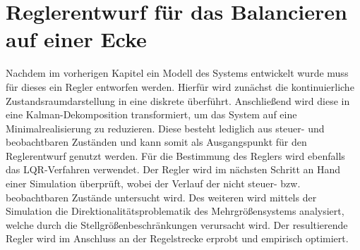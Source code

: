 \ifx\FORMAT\undefined


\fi

\chapter{Reglerentwurf für das Balancieren auf einer Ecke}\label{chapter_RT_Corner}
Nachdem im vorherigen Kapitel ein Modell des Systems entwickelt wurde muss für dieses ein Regler entworfen werden. Hierfür wird zunächst die kontinuierliche Zustandsraumdarstellung in eine diskrete überführt. Anschließend wird diese in eine Kalman-Dekomposition transformiert, um das System auf eine Minimalrealisierung zu reduzieren. Diese besteht lediglich aus steuer- und beobachtbaren Zuständen und kann somit als Ausgangspunkt für den Reglerentwurf genutzt werden. Für die Bestimmung des Reglers wird ebenfalls das LQR-Verfahren verwendet. Der Regler wird im nächsten Schritt an Hand einer Simulation überprüft, wobei der Verlauf der nicht steuer- bzw. beobachtbaren Zustände untersucht wird. Des weiteren wird mittels der Simulation die Direktionalitätsproblematik des Mehrgrößensystems analysiert, welche durch die Stellgrößenbeschränkungen verursacht wird. Der resultierende Regler wird im Anschluss an der Regelstrecke erprobt und empirisch optimiert.

\newpage

\newpage

\newpage


\ifx\FORMAT\undefined

\fi
